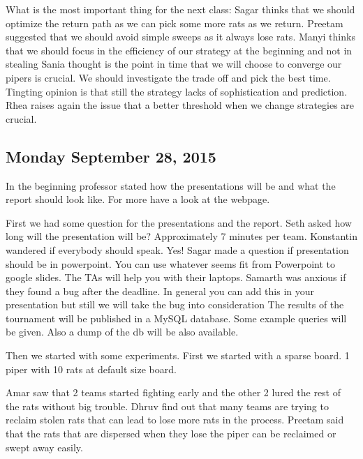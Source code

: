 What is the most important thing for the next class:
Sagar thinks that we should optimize the return path as we can pick some more rats as we return.
Preetam suggested that we should avoid simple sweeps as it always lose rats.
Manyi thinks that we should focus in the efficiency of our strategy at the beginning and not in stealing
Sania thought is the point in time that we will choose to converge our pipers is crucial. We should investigate the trade off and pick the best time. 
Tingting opinion is that still the strategy lacks of sophistication and prediction.
Rhea raises again the issue that a better threshold when we change strategies are crucial.

\subsection{Monday September 28, 2015}
In the beginning professor stated how the presentations will be and what the report should look like.  For more have a look at the webpage.

First we had some question for the presentations and the report. 
Seth asked how long will the presentation will be?
Approximately 7 minutes per team.
Konstantin wandered if everybody should speak. Yes!
Sagar made a question if presentation should be in powerpoint.
You can use whatever seems fit from Powerpoint to google slides.
The TAs will help you with their laptops. 
Samarth was anxious if they found a bug after the deadline.
In general you can add this in your presentation but still we will take the bug into consideration
The results of the tournament will be published in a MySQL database. Some example queries will be given. Also a dump of the db will be also available.

Then we started with some experiments. First we started with a sparse board. 1 piper with 10 rats at default size board.

Amar saw that 2 teams started fighting early and the other 2 lured the rest of the rats without big trouble.
Dhruv find out that many teams are trying to reclaim stolen rats that can lead to lose more rats in the process.
Preetam said that the rats that are dispersed when they lose the piper can be reclaimed or swept away easily.

